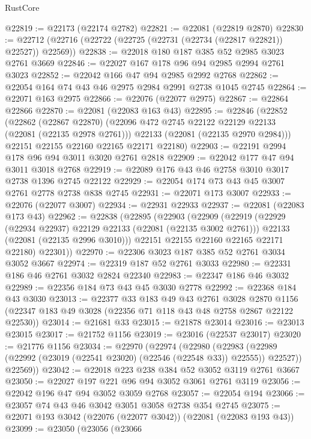 \begin{lexlean}{RustCore}
\begin{coremodule}
@22819 := @22173 (@22174 @2782)
@22821 := @22081 (@22819 @2870)
@22830 := @22712 (@22716 (@22722 (@22725 (@22731 (@22734 (@22817 @22821)) @22527)) @22569))
@22838 := @22018 @180 @187 @385 @52 @2985 @3023 @2761 @3669
@22846 := @22027 @167 @178 @96 @94 @2985 @2994 @2761 @3023
@22852 := @22042 @166 @47 @94 @2985 @2992 @2768
@22862 := @22054 @164 @74 @43 @46 @2975 @2984 @2991 @2738 @1045 @2745
@22864 := @22071 @163 @2975
@22866 := @22076 (@22077 @2975)
@22867 := @22864 @22866
@22870 := @22081 (@22083 @163 @43)
@22895 := @22846
    (@22852
      (@22862
        (@22867 @22870)
        (@22096 @472 @2745 @22122 @22129 @22133 (@22081 (@22135 @2978 @2761)))
        @22133
        (@22081 (@22135 @2970 @2984)))
      @22151
      @22155
      @22160
      @22165
      @22171
      @22180)
@22903 := @22191 @2994 @178 @96 @94 @3011 @3020 @2761 @2818
@22909 := @22042 @177 @47 @94 @3011 @3018 @2768
@22919 := @22089 @176 @43 @46 @2758 @3010 @3017 @2738 @1396 @2745 @22122
@22929 := @22054 @174 @73 @43 @45 @3007 @2761 @2778 @2738 @838 @2745
@22931 := @22071 @173 @3007
@22933 := @22076 (@22077 @3007)
@22934 := @22931 @22933
@22937 := @22081 (@22083 @173 @43)
@22962 := @22838
    (@22895
      (@22903
        (@22909
          (@22919
            (@22929 (@22934 @22937) @22129 @22133 (@22081 (@22135 @3002 @2761)))
            @22133
            (@22081 (@22135 @2996 @3010)))
          @22151
          @22155
          @22160
          @22165
          @22171
          @22180)
        @22301))
@22970 := @22306 @3023 @187 @385 @52 @2761 @3034 @3052 @3667
@22974 := @22319 @187 @52 @2761 @3033
@22980 := @22331 @186 @46 @2761 @3032 @2824 @22340
@22983 := @22347 @186 @46 @3032
@22989 := @22356 @184 @73 @43 @45 @3030 @2778
@22992 := @22368 @184 @43 @3030
@23013 := @22377
    @33
    @183
    @49
    @43
    @2761
    @3028
    @2870
    @1156
    (@22347 @183 @49 @3028 (@22356 @71 @118 @43 @48 @2758 @2867 @22122 @22530))
@23014 := @21681 @33
@23015 := @21878 @23014
@23016 := @23013 @23015
@23017 := @21752 @1156
@23019 := @23016 (@22537 @23017)
@23020 := @21776 @1156
@23034 := @22970
    (@22974
      (@22980
        (@22983 (@22989 (@22992 (@23019 (@22541 @23020) (@22546 (@22548 @33)) @22555)) @22527))
        @22569))
@23042 := @22018 @223 @238 @384 @52 @3052 @3119 @2761 @3667
@23050 := @22027 @197 @221 @96 @94 @3052 @3061 @2761 @3119
@23056 := @22042 @196 @47 @94 @3052 @3059 @2768
@23057 := @22054 @194
@23066 := @23057 @74 @43 @46 @3042 @3051 @3058 @2738 @354 @2745
@23075 := @22071 @193 @3042 (@22076 (@22077 @3042)) (@22081 (@22083 @193 @43))
@23099 := @23050
    (@23056
      (@23066

\end{coremodule}
\end{lexlean}
